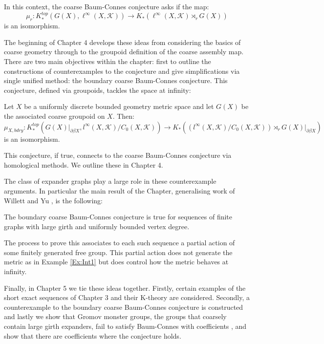 In this context, the coarse Baum-Connes conjecture asks if the map:
\begin{equation*}
\mu_{r}:K_{*}^{top}(G(X), \ell^{\infty}(X,\mathcal{K})) \rightarrow K_{*}(\ell^{\infty}(X,\mathcal{K})\rtimes_{r}G(X))
\end{equation*}
is an isomorphism.

The beginning of Chapter 4 develops these ideas from considering the basics of coarse geometry through to the groupoid definition of the coarse assembly map. There are two main objectives within the chapter: first to outline the constructions of counterexamples to the conjecture \cite{higsonpreprint,MR1911663,explg1,explg2,MR2568691} and give simplifications via single unified method: the boundary coarse Baum-Connes conjecture. This conjecture, defined via groupoids, tackles the space at infinity:
\begin{conjecture}
Let $X$ be a uniformly discrete bounded geometry metric space and let $G(X)$ be the associated coarse groupoid on $X$. Then:
\begin{equation*}
\mu_{X,bdry}:K_{*}^{top}(G(X)|_{\partial\beta X}, l^{\infty}(X,\mathcal{K})/C_{0}(X,\mathcal{K})) \rightarrow K_{*}((l^{\infty}(X,\mathcal{K})/C_{0}(X,\mathcal{K}))\rtimes_{r}G(X)|_{\partial\beta X})
\end{equation*}
is an isomorphism.
\end{conjecture}
This conjecture, if true, connects to the coarse Baum-Connes conjecture via homological methods. We outline these in Chapter 4.

The class of expander graphs \cite{MR2247919} play a large role in these counterexample arguments. In particular the main result of the Chapter, generalising work of Willett and Yu \cite{explg1}, is the following:
\begin{thm}
The boundary coarse Baum-Connes conjecture is true for sequences of finite graphs with large girth and uniformly bounded vertex degree.
\end{thm}

The process to prove this associates to each such sequence a partial action of some finitely generated free group. This partial action does not generate the metric as in Example \ref{Ex:Int1} but does control how the metric behaves at infinity. 

Finally, in Chapter 5 we tie these ideas together. Firstly, certain examples of the short exact sequences of Chapter 3 and their K-theory are considered. Secondly, a counterexample to the boundary coarse Baum-Connes conjecture is constructed and lastly we show that Gromov monster groups, the groups that coarsely contain large girth expanders, fail to satisfy Baum-Connes with coefficients \cite{MR1978492,exrangrps}, and show that there are coefficients where the conjecture holds.

